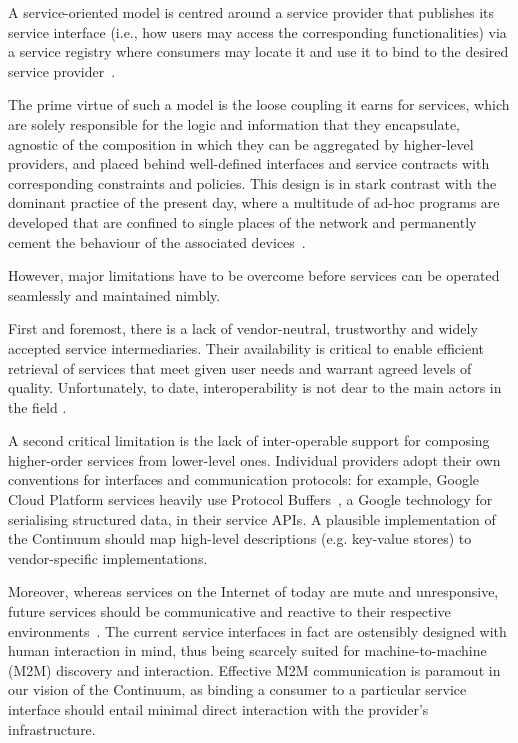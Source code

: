 A service-oriented model is centred around a service provider that publishes its service interface (i.e., how users may access the corresponding functionalities) via a service registry where consumers may locate it and use it to bind to the desired service provider~\cite{haller2008internet}.

The prime virtue of such a model is the loose coupling it earns for services, which are solely responsible for the logic and information that they encapsulate, agnostic of the composition in which they can be aggregated by higher-level providers, and placed behind well-defined interfaces and service contracts with corresponding constraints and policies.
This design is in stark contrast with the dominant practice of the present day, where a multitude of ad-hoc programs are developed that are confined to single places of the network and permanently cement the behaviour of the associated devices~\cite{beckman2020harnessing}.

However, major limitations have to be overcome before services can be operated seamlessly and maintained nimbly.  

First and foremost, there is a lack of vendor-neutral, trustworthy and widely accepted service intermediaries. Their availability is critical to enable efficient retrieval of services that meet given user needs and warrant agreed levels of quality. Unfortunately, to date, interoperability is not dear to the main actors in the field \textcolor{red}{\cite{grozev2014inter}}.

A second critical limitation is the lack of inter-operable support for composing higher-order services from lower-level ones. 
Individual providers adopt their own conventions for interfaces and communication protocols: for example, Google Cloud Platform services heavily use Protocol Buffers~\cite{protobuf}, a Google technology for serialising structured data, in their service APIs. 
A plausible implementation of the Continuum should map high-level descriptions (e.g. key-value stores) to vendor-specific implementations.

Moreover, whereas services on the Internet of today are mute and unresponsive, future services should be communicative and reactive to their respective environments~\cite{haller2008internet}. 
The current service interfaces in fact are ostensibly designed with human interaction in mind, thus being scarcely suited for machine-to-machine (M2M) discovery and interaction. Effective M2M communication is paramout in our vision of the Continuum, as binding a consumer to a particular service interface should entail minimal direct interaction with the provider's infrastructure.

